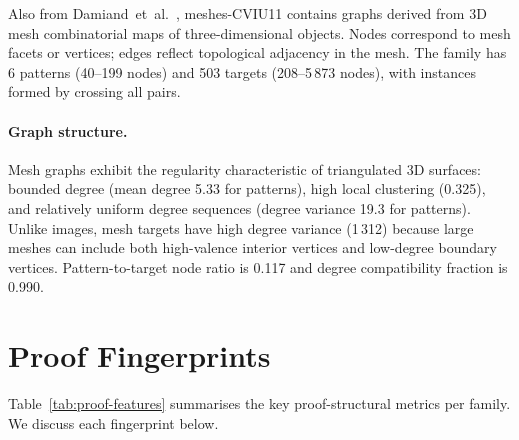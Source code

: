 \documentclass[11pt,a4paper]{article}
\begin{document}
Also from Damiand~et~al.~\cite{damiand-solnon-cviu2011}, meshes-CVIU11 contains graphs derived
from 3D mesh combinatorial maps of three-dimensional objects.
Nodes correspond to mesh facets or vertices; edges reflect topological adjacency in the mesh.
The family has 6 patterns (40--199 nodes) and 503 targets (208--5\,873 nodes),
with instances formed by crossing all pairs.

\paragraph{Graph structure.} Mesh graphs exhibit the regularity characteristic of triangulated
3D surfaces: bounded degree (mean degree 5.33 for patterns), high local clustering (0.325),
and relatively uniform degree sequences (degree variance 19.3 for patterns).
Unlike images, mesh targets have high degree variance (1\,312) because large meshes can include
both high-valence interior vertices and low-degree boundary vertices.
Pattern-to-target node ratio is 0.117 and degree compatibility fraction is 0.990.

\section{Proof Fingerprints}

Table~\ref{tab:proof-features} summarises the key proof-structural metrics per family.
We discuss each fingerprint below.
\end{document}

